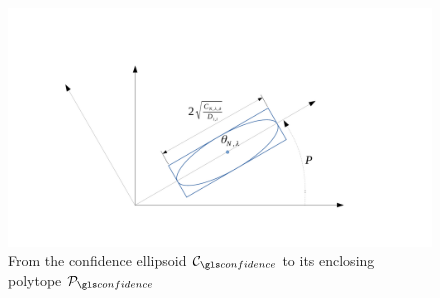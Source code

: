 \begin{subappendices}
	\begin{figure}[ht]
		\centering
		\includegraphics[trim={3.8cm, 2cm, 5cm, 3.8cm}, clip, width=0.7\linewidth]{img/ellipsoid_to_polytope}
		\caption{From the confidence ellipsoid $\cC_\confidence$ to its enclosing polytope $\cP_\confidence$}
		\label{fig:ellipsoid_to_polytope}
	\end{figure}
	

\end{subappendices}

